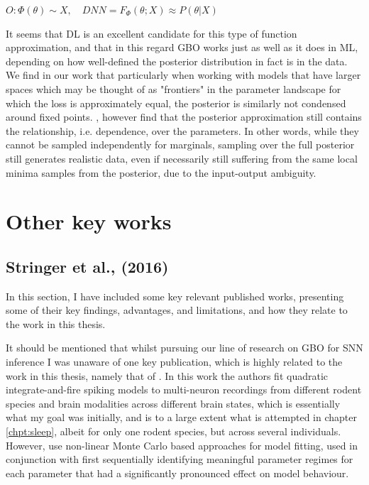 \documentclass[mphil,deptreport,ianc]{infthesis} %
\begin{document}
\begin{math}
    O: \Phi(\theta) \sim X, \quad
    DNN = F_\Phi(\theta; X) \approx P(\theta|X)
\end{math}

It seems that DL is an excellent candidate for this type of function approximation, and that in this regard GBO works just as well as it does in ML, depending on how well-defined the posterior distribution in fact is in the data.
We find in our work that particularly when working with models that have larger spaces which may be thought of as "frontiers" in the parameter landscape for which the loss is approximately equal, the posterior is similarly not condensed around fixed points.
\cite{Lueckmann2021}, however find that the posterior approximation still contains the relationship, i.e. dependence, over the parameters. %
In other words, while they cannot be sampled independently for marginals, sampling over the full posterior still generates realistic data, even if necessarily still suffering from the same local minima samples from the posterior, due to the input-output ambiguity.


\section{Other key works}\label{sect:key_works}


\subsection{Stringer et al., (2016)}
In this section, I have included some key relevant published works, presenting some of their key findings, advantages, and limitations, and how they relate to the work in this thesis.

It should be mentioned that whilst pursuing our line of research on GBO for SNN inference I was unaware of one key publication, which is highly related to the work in this thesis, namely that of \cite{Stringer2016InhibitoryNetworks}.
In this work the authors fit quadratic integrate-and-fire spiking models to multi-neuron recordings from different rodent species and brain modalities across different brain states, which is essentially what my goal was initially, and is to a large extent what is attempted in chapter \ref{chpt:sleep}, albeit for only one rodent species, but across several individuals.
However, \cite{Stringer2016InhibitoryNetworks} use non-linear Monte Carlo based approaches for model fitting, used in conjunction with first sequentially identifying meaningful parameter regimes for each parameter that had a significantly pronounced effect on model behaviour.
\end{document}
